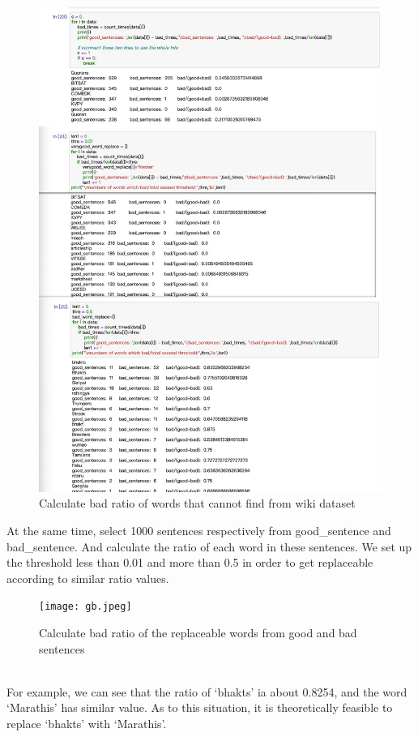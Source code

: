 \documentclass{article}
\begin{document}
\begin{figure}[H]
	\centering
	\includegraphics[scale = 0.15]{insert.jpeg}
	\caption{Calculate bad ratio of words that cannot find from wiki dataset}
\end{figure}
\noindent At the same time, select 1000 sentences respectively from good\_sentence and bad\_sentence. And calculate the ratio of each word in these sentences. We set up the threshold less than 0.01 and more than 0.5 in order to get replaceable according to similar ratio values.  
\begin{figure}[h]
	\centering
	\texttt{[image: gb.jpeg]}
	\caption{Calculate bad ratio of the replaceable words from good and bad sentences}
\end{figure}\\
\noindent For example, we can see that the ratio of ‘bhakts’ ia about 0.8254, and the word ‘Marathis’ has similar value. As to this situation, it is theoretically feasible to replace ‘bhakts’ with ‘Marathis’. \\
\end{document}

